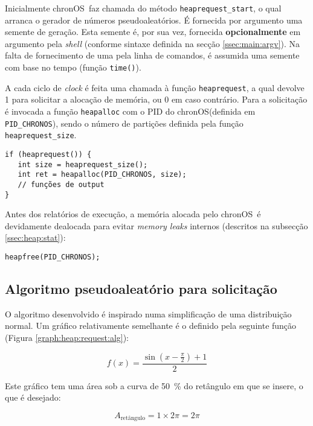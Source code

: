 \documentclass[10pt,oneside]{estiloUBI}
\newcommand{\chronOS}{\textsf{chronOS}}
\begin{document}
	Inicialmente \chronOS~faz chamada do método \verb|heaprequest_start|, o qual arranca o gerador de números pseudoaleatórios. É fornecida por argumento uma semente de geração. Esta semente é, por sua vez, fornecida \textbf{opcionalmente} em argumento pela \textit{shell} (conforme sintaxe definida na secção \ref{ssec:main:argv}). Na falta de fornecimento de uma pela linha de comandos, é assumida uma semente com base no tempo (função \verb|time()|).
	
	A cada ciclo de \textit{clock} é feita uma chamada à função \verb|heaprequest|, a qual devolve 1 para solicitar a alocação de memória, ou 0 em caso contrário. Para a solicitação é invocada a função \verb|heapalloc| com o PID do \chronOS (definida em \verb|PID_CHRONOS|), sendo o número de partições definida pela função \verb|heaprequest_size|.
	
	\begin{verbatim}
if (heaprequest()) {
   int size = heaprequest_size();
   int ret = heapalloc(PID_CHRONOS, size);
   // funções de output
}
	\end{verbatim}
	
	Antes dos relatórios de execução, a memória alocada pelo \chronOS~é devidamente dealocada para evitar \textit{memory leaks} internos (descritos na subsecção \ref{ssec:heap:stat}):
	
	\begin{verbatim}
heapfree(PID_CHRONOS);
	\end{verbatim}
	
	
	\subsection{Algoritmo pseudoaleatório para solicitação}
	\label{sssec:heap:request:alg}
	
	O algoritmo desenvolvido é inspirado numa simplificação de uma distribuição normal. Um gráfico relativamente semelhante é o definido pela seguinte função (Figura \ref{graph:heap:request:alg}):
	
	\begin{equation}
f(x) = \frac{\sin\left(x - \frac{\pi}{2}\right) + 1}{2}
	\end{equation}
	
	Este gráfico tem uma área sob a curva de \SI{50}{\percent} do retângulo em que se insere, o que é desejado:
	
	\begin{displaymath}
		A_{\textrm{retângulo}} = 1 \times 2\pi = 2\pi
	\end{displaymath}
	
\end{document}
